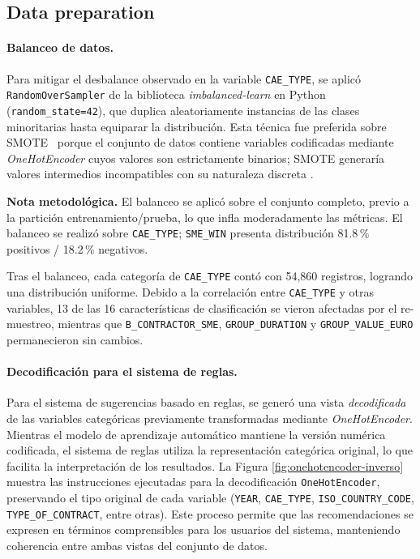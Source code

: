\documentclass[a4paper,fleqn]{cas-sc}
\begin{document}
\subsection*{Data preparation}

\paragraph{\textbf{Balanceo de datos.}}
%
	Para mitigar el desbalance observado en la variable \texttt{CAE\_TYPE}, se aplicó \texttt{RandomOverSampler} de la biblioteca \textit{imbalanced-learn} en Python (\texttt{random\_state=42}), que duplica aleatoriamente instancias de las clases minoritarias hasta equiparar la distribución. Esta técnica fue preferida sobre SMOTE~\cite{chawla2002smote} porque el conjunto de datos contiene variables codificadas mediante \textit{OneHotEncoder} cuyos valores son estrictamente binarios; SMOTE generaría valores intermedios incompatibles con su naturaleza discreta \cite{geron2019hands,raschka2020python}.

\textbf{Nota metodológica.} El balanceo se aplicó sobre el conjunto completo, previo a la partición entrenamiento/prueba, lo que infla moderadamente las métricas. El balanceo se realizó sobre \texttt{CAE\_TYPE}; \texttt{SME\_WIN} presenta distribución 81.8\,\% positivos / 18.2\,\% negativos.

	Tras el balanceo, cada categoría de \texttt{CAE\_TYPE} contó con 54,860 registros, logrando una distribución uniforme. 
Debido a la correlación entre \texttt{CAE\_TYPE} y otras variables, 13 de las 16 características de clasificación se vieron afectadas por el re-muestreo, mientras que \linebreak \texttt{B\_CONTRACTOR\_SME},  \texttt{GROUP\_DURATION} y \texttt{GROUP\_VALUE\_EURO} permanecieron sin cambios.

\paragraph{\textbf{Decodificación para el sistema de reglas.}}

	Para el sistema de sugerencias basado en reglas, se generó una vista \emph{decodificada} de las variables categóricas previamente transformadas mediante \textit{OneHotEncoder}. 
Mientras el modelo de aprendizaje automático mantiene la versión numérica codificada, el sistema de reglas utiliza la representación categórica original, lo que facilita la interpretación de los resultados. 
La Figura \ref{fig:onehotencoder-inverso} muestra las instrucciones ejecutadas para la decodificación
 \texttt{OneHotEncoder}, preservando el tipo original de cada variable (\texttt{YEAR}, \texttt{CAE\_TYPE}, \texttt{ISO\_COUNTRY\_CODE}, \texttt{TYPE\_OF\_CONTRACT}, entre otras). 
Este proceso permite que las recomendaciones se expresen en términos comprensibles para los usuarios del sistema, manteniendo coherencia entre ambas vistas del conjunto de datos.
\end{document}

